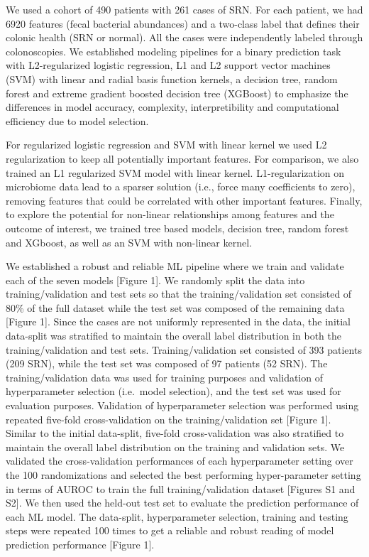 \documentclass[11pt,]{article}
\begin{document}
We used a cohort of 490 patients with 261 cases of SRN. For each
patient, we had 6920 features (fecal bacterial abundances) and a
two-class label that defines their colonic health (SRN or normal). All
the cases were independently labeled through colonoscopies. We
established modeling pipelines for a binary prediction task with
L2-regularized logistic regression, L1 and L2 support vector machines
(SVM) with linear and radial basis function kernels, a decision tree,
random forest and extreme gradient boosted decision tree (XGBoost) to
emphasize the differences in model accuracy, complexity,
interpretibility and computational efficiency due to model selection.

For regularized logistic regression and SVM with linear kernel we used
L2 regularization to keep all potentially important features. For
comparison, we also trained an L1 regularized SVM model with linear
kernel. L1-regularization on microbiome data lead to a sparser solution
(i.e., force many coefficients to zero), removing features that could be
correlated with other important features. Finally, to explore the
potential for non-linear relationships among features and the outcome of
interest, we trained tree based models, decision tree, random forest and
XGboost, as well as an SVM with non-linear kernel.

We established a robust and reliable ML pipeline where we train and
validate each of the seven models {[}Figure 1{]}. We randomly split the
data into training/validation and test sets so that the
training/validation set consisted of 80\% of the full dataset while the
test set was composed of the remaining data {[}Figure 1{]}. Since the
cases are not uniformly represented in the data, the initial data-split
was stratified to maintain the overall label distribution in both the
training/validation and test sets. Training/validation set consisted of
393 patients (209 SRN), while the test set was composed of 97 patients
(52 SRN). The training/validation data was used for training purposes
and validation of hyperparameter selection (i.e.~model selection), and
the test set was used for evaluation purposes. Validation of
hyperparameter selection was performed using repeated five-fold
cross-validation on the training/validation set {[}Figure 1{]}. Similar
to the initial data-split, five-fold cross-validation was also
stratified to maintain the overall label distribution on the training
and validation sets. We validated the cross-validation performances of
each hyperparameter setting over the 100 randomizations and selected the
best performing hyper-parameter setting in terms of AUROC to train the
full training/validation dataset {[}Figures S1 and S2{]}. We then used
the held-out test set to evaluate the prediction performance of each ML
model. The data-split, hyperparameter selection, training and testing
steps were repeated 100 times to get a reliable and robust reading of
model prediction performance {[}Figure 1{]}.
\end{document}
